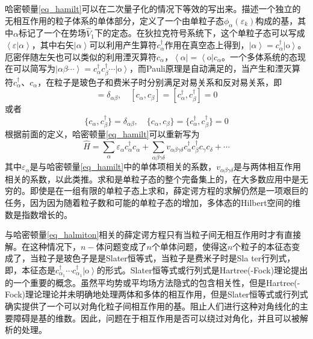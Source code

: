 哈密顿量\ref{eq_hamilt}可以在二次量子化的情况下等效的写出来。描述一个独立的无相互作用的粒子体系的单体部分，定义了一个由单粒子态$\phi_\alpha(\varepsilon_k)$构成的基，其中$\alpha$标记了一个在势场$\widehat{V}_1$下的定态。在狄拉克符号系统下，这个单粒子态可以写成$\left<\varepsilon|\alpha\right>$，其中右矢$\left|\alpha\right>$可以利用产生算符$c_\alpha^\dag$作用在真空态上得到，$\left|\alpha\right>=c_\alpha^\dag\left|\textrm{o}\right>$。厄密伴随左矢也可以类似的利用湮灭算符$c_\alpha$，$\left<\alpha\right|=\left<\textrm{o}\right|c_\alpha$。一个多体系统的态现在可以简写为$\left|\alpha\beta\cdots\right>=c_\alpha^\dag c_\beta^\dag\cdots\left|\textrm{o}\right>$，而Pauli原理是自动满足的，当产生和湮灭算符$c_\alpha^\dag$、$c_\alpha$，在粒子是玻色子和费米子时分别满足对易关系和反对易关系，即
\begin{equation*}
[c_\alpha,c_\beta^\dag]=\delta_{\alpha\beta},\quad[c_\alpha,c_\beta]=[c_\alpha^\dag,c_\beta^\dag]=0
\end{equation*}
或者
\begin{equation*}
\{c_\alpha,c_\beta^\dag\}=\delta_{\alpha\beta},\quad\{c_\alpha,c_\beta\}=\{c_\alpha^\dag,c_\beta^\dag\}=0
\end{equation*}
根据前面的定义，哈密顿量\ref{eq_hamilt}可以重新写为
\begin{equation}\label{eq_halmiton}
\widehat{H}=\sum_\alpha\varepsilon_\alpha c_\alpha^\dag c_\alpha+\sum_{\alpha\beta\gamma\delta}v_{\alpha\beta\gamma\delta}c_\alpha^\dag c_\beta^\dag c_\gamma c_\delta+\cdots
\end{equation}
其中$\varepsilon_\alpha$是与哈密顿量\ref{eq_hamilt}中的单体项相关的系数，$v_{\alpha\beta\gamma\delta}$是与两体相互作用相关的系数，以此类推。求和是单粒子态的整个完备集上的，在大多数应用中是无穷的。即使是在一组有限的单粒子态上求和，薛定谔方程的求解仍然是一项艰巨的任务，因为因为随着粒子数和可能的单粒子态的增加，多体态的Hilbert空间的维数是指数增长的。

与哈密顿量\ref{eq_halmiton}相关的薛定谔方程只有当粒子间无相互作用时才有直接解。在这种情况下，$n-$体问题变成了$n$个单体问题，使得这$n$个粒子的本征态变成了，当粒子是玻色子是是Slater恒等式，当粒子是费米子时是Sla	ter行列式，即，本征态是$c_{\alpha_1}^\dag\cdots c_{\alpha_1}^\dag\left|\textrm{o}\right>$的形式。Slater恒等式或行列式是Hartree(-Fock)理论提出的一个重要的概念。虽然平均势或平均场方法隐式的包含相关性，但是Hartree(-Fock)理论理论并未明确地处理两体和多体的相互作用，但是Slater恒等式或行列式确实提供了一个可以对角化粒子间相互作用的基。阻止人们进行这种对角线化的主要障碍是基的维数。因此，问题在于相互作用是否可以绕过对角化，并且可以被解析的处理。

